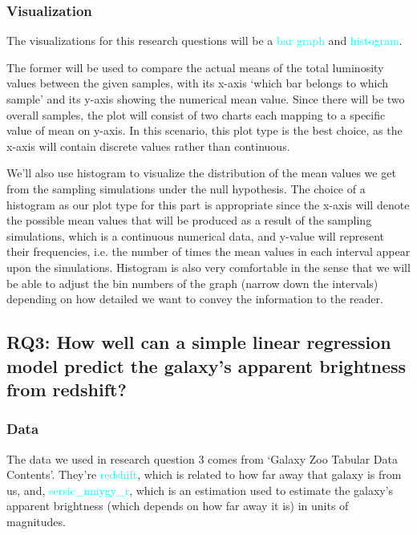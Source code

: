 \documentclass[12pt]{article}
\begin{document}
\subsubsection{Visualization}

The visualizations for this research questions will be a \textcolor{cyan}{bar graph} and \textcolor{cyan}{histogram}. 


\noindent The former will be used to compare the actual means of the total luminosity values between the given samples, with its x-axis `which bar belongs to which sample' and its y-axis showing the numerical mean value. Since there will be two overall samples, the plot will consist of two charts each mapping to a specific value of mean on y-axis. In this scenario, this plot type is the best choice, as the x-axis will contain discrete values rather than continuous. 



\noindent We'll also use histogram to visualize the distribution of the mean values we get from the sampling simulations under the null hypothesis. The choice of a histogram as our plot type for this part is appropriate since the x-axis will denote the possible mean values that will be produced as a result of the sampling simulations, which is a continuous numerical data, and y-value will represent their frequencies, i.e. the number of times the mean values in each interval appear upon the simulations. Histogram is also very comfortable in the sense that we will be able to adjust the bin numbers of the graph (narrow down the intervals) depending on how detailed we want to convey the information to the reader.


\subsection{RQ3: How well can a simple linear regression model predict the galaxy's apparent brightness from redshift?}


\subsubsection{Data}

The data we used in research question 3 comes from `Galaxy Zoo Tabular Data Contents'. They're \textcolor{cyan}{redshift}, which is related to how far away that galaxy is from us, and, \textcolor{cyan}{sersic\_nmygy\_r}, which is an estimation used to estimate the galaxy's apparent brightness (which depends on how far away it is) in units of magnitudes. 
\end{document}
